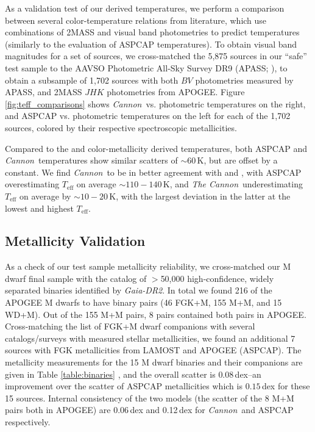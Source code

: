 \documentclass[twocolumn]{aastex62}
\newcommand{\thecannon}{\textsl{The Cannon}}
\newcommand{\cannon}{\textsl{Cannon}}
\newcommand{\drtwo}{\textsl{Gaia-DR2}}
\newcommand{\teff}{T_{\mathrm{eff}}}
\begin{document}
As a validation test of our derived temperatures, we perform a comparison between several color-temperature relations from literature, which use combinations of 2MASS and visual band photometries to predict temperatures (similarly to the \citealt{Schmidt:2016} evaluation of ASPCAP temperatures). To obtain visual band magnitudes for a set of sources, we cross-matched the 5,875 sources in our ``safe'' test sample to the AAVSO Photometric All-Sky Survey DR9 (APASS; \citealt{Henden:2016}), to obtain a subsample of 1,702 sources with both $BV$ photometries measured by APASS, and 2MASS $JHK$ photometries from APOGEE. Figure \ref{fig:teff_comparisons} shows \cannon\ vs. photometric temperatures on the right, and ASPCAP vs. photometric temperatures on the left for each of the 1,702 sources, colored by their respective spectroscopic metallicities.

Compared to the \citet{Mann:2015} and \citet{Boyajian:2012} color-metallicity derived temperatures, both ASPCAP and \cannon\ temperatures show similar scatters of $\sim60\,$K, but are offset by a constant.
We find \cannon\ to be in better agreement with \citet{Mann:2015} and \citet{Boyajian:2012}, with ASPCAP overestimating $\teff$ on average $\sim110-140\,$K, and \thecannon\ underestimating $\teff$ on average by $\sim10-20\,$K, with the largest deviation in the latter at the lowest and highest $\teff$.

\subsection{Metallicity Validation}

As a check of our test sample metallicity reliability, we cross-matched our M dwarf final sample with the \citet{Elbadry:2018b} catalog of $>$50,000 high-confidence, widely separated binaries identified by \drtwo. 
In total we found 216 of the APOGEE M dwarfs to have binary pairs (46 FGK+M, 155 M+M, and 15 WD+M). Out of the 155 M+M pairs, 8 pairs contained both pairs in APOGEE. Cross-matching the list of FGK+M dwarf companions with several catalogs/surveys with measured stellar metallicities, we found an additional 7 sources with FGK metallicities from LAMOST \citep{Zhao:2012} and APOGEE (ASPCAP). The metallicity measurements for the 15 M dwarf binaries and their companions are given in Table \ref{table:binaries} \color{black}, and the overall scatter is $0.08\,$dex--an improvement over the scatter of ASPCAP metallicities which is $0.15\,$dex for these 15 sources. Internal consistency of the two models (the scatter of the 8 M+M pairs both in APOGEE) are 0.06\,dex and 0.12\,dex for \cannon\ and ASPCAP respectively.
\end{document}
